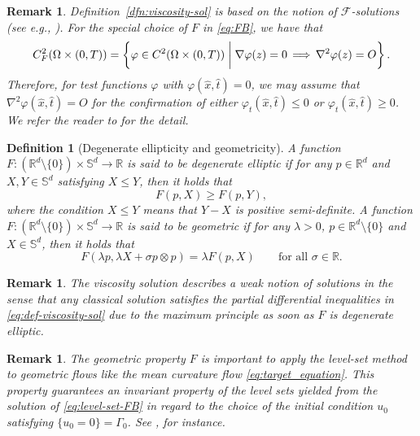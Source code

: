 \documentclass[11pt]{article}
\numberwithin{equation}{section}
\newtheorem{defn}[theorem]{Definition}
\newtheorem{remark}[theorem]{Remark}
\newcommand{\R}{\mathbb{R}}
\def\le{\leqslant}
\def\leq{\leqslant}
\def\ge{\geqslant}
\def\geq{\geqslant}
\begin{document}
\begin{remark}
Definition~\ref{dfn:viscosity-sol} is based on the notion of $\mathcal F$-solutions (see e.g., \cite[Definition 2.3.7]{G06}).
For the special choice of $F$ in \eqref{eq:FB}, we have that
\begin{equation}
    \label{eq:compatible-set}
C^2_F(\Omega\times(0,T)) = \left\{\varphi\in C^2(\Omega\times(0,T))\biggm|\nabla\varphi(z) = 0\,\Longrightarrow\,\nabla^2\varphi(z) = O\right\}.
\end{equation}
Therefore, for test functions $\varphi$ with $\varphi(\hat x,\hat t) = 0$,
we may assume that $\nabla^2\varphi(\hat x, \hat t) = O$ for the confirmation of either $\varphi_t(\hat x,\hat t) \leq 0$ or $\varphi_t(\hat x,\hat t) \geq 0$.
We refer the reader to \cite[Remark 2.1.6, Proposition 2.1.8]{G06} for the detail.
\end{remark}

\begin{defn}[Degenerate ellipticity and geometricity]
    A function $F:(\R^d\setminus\{0\})\times\mathbb S^{d}\to\R$ is said to be degenerate elliptic if for any $p\in\R^d$ and $X,Y\in\mathbb S^d$ satisfying $X\le Y$, then it holds that
    \[F(p,X) \ge F(p,Y),
    \]
    where the condition $X\le Y$ means that $Y - X$ is positive semi-definite.
    A function $F:(\R^d\setminus\{0\})\times\mathbb S^d\to\R$ is said to be geometric if for any $\lambda > 0$, $p\in\R^d\setminus\{0\}$ and $X\in\mathbb S^d$, then it holds that
    \[F(\lambda p, \lambda X + \sigma p\otimes p) = \lambda F(p,X)\qquad\mbox{for all }\sigma\in\R.
    \]
\end{defn}

\begin{remark}
    The viscosity solution describes a weak notion of solutions in the sense that any classical solution satisfies the partial differential inequalities in \eqref{eq:def-viscosity-sol} due to the maximum principle as soon as $F$ is degenerate elliptic.
\end{remark}

\begin{remark}
    The geometric property $F$ is important to apply the level-set method to geometric flows like the mean curvature flow \eqref{eq:target_equation}.
    This property guarantees an invariant property of the level sets yielded from the solution of \eqref{eq:level-set-FB} in regard to the choice of the initial condition $u_0$
    satisfying $\{u_0 = 0\} = \Gamma_0$. See \cite[Theorem 4.2]{B99}, for instance.
\end{remark}
\end{document}
